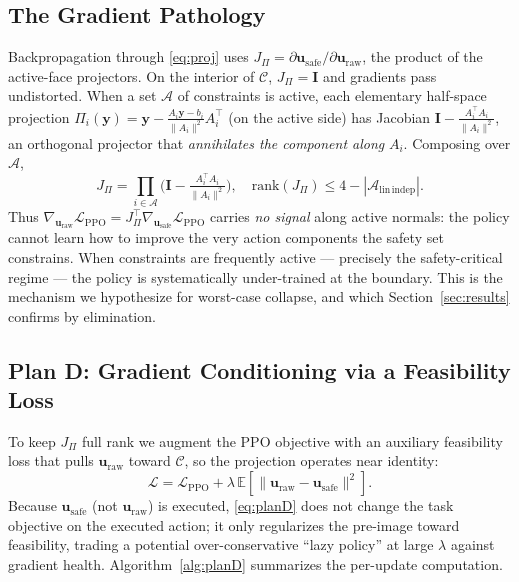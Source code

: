 \documentclass[journal]{IEEEtran}
\newcommand{\uraw}{\mathbf{u}_{\mathrm{raw}}}
\newcommand{\usafe}{\mathbf{u}_{\mathrm{safe}}}
\begin{document}
\subsection{The Gradient Pathology}
Backpropagation through \eqref{eq:proj} uses
$J_\Pi=\partial\usafe/\partial\uraw$, the product of the active-face
projectors. On the interior of $\mathcal C$, $J_\Pi=\mathbf I$ and gradients
pass undistorted. When a set $\mathcal A$ of constraints is active, each
elementary half-space projection $\Pi_i(\mathbf y)=\mathbf y-
\tfrac{A_i\mathbf y-b_i}{\lVert A_i\rVert^2}A_i^\top$ (on the active side) has
Jacobian $\mathbf I-\tfrac{A_i^\top A_i}{\lVert A_i\rVert^2}$, an orthogonal
projector that \emph{annihilates the component along} $A_i$. Composing over
$\mathcal A$,
\begin{equation}
J_\Pi=\textstyle\prod_{i\in\mathcal A}\!\Big(\mathbf I-\tfrac{A_i^\top A_i}{\lVert A_i\rVert^2}\Big),
\quad \mathrm{rank}(J_\Pi)\le 4-|\mathcal A_{\mathrm{lin\,indep}}|.
\label{eq:jacrank}
\end{equation}
Thus $\nabla_{\uraw}\mathcal L_{\mathrm{PPO}}=J_\Pi^\top\nabla_{\usafe}
\mathcal L_{\mathrm{PPO}}$ carries \emph{no signal} along active normals: the
policy cannot learn how to improve the very action components the safety set
constrains. When constraints are frequently active --- precisely the
safety-critical regime --- the policy is systematically under-trained at the
boundary. This is the mechanism we hypothesize for worst-case collapse, and
which Section~\ref{sec:results} confirms by elimination.

\subsection{Plan D: Gradient Conditioning via a Feasibility Loss}
To keep $J_\Pi$ full rank we augment the PPO objective with an auxiliary
feasibility loss that pulls $\uraw$ toward $\mathcal C$, so the projection
operates near identity:
\begin{equation}
\mathcal L=\mathcal L_{\mathrm{PPO}}+
\lambda\,\mathbb E\!\left[\lVert\uraw-\usafe\rVert^2\right].
\label{eq:planD}
\end{equation}
Because $\usafe$ (not $\uraw$) is executed, \eqref{eq:planD} does not change
the task objective on the executed action; it only regularizes the pre-image
toward feasibility, trading a potential over-conservative ``lazy policy'' at
large $\lambda$ against gradient health. Algorithm~\ref{alg:planD} summarizes
the per-update computation.
\end{document}
